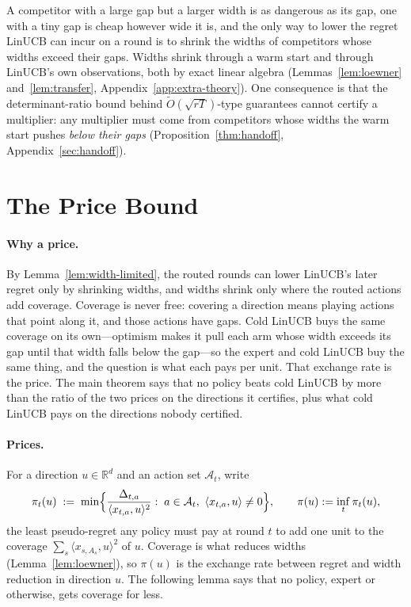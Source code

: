\documentclass{article}
\theoremstyle{definition}
\theoremstyle{remark}
\newcommand{\R}{\mathbb{R}}
\theoremstyle{remark}
\begin{document}
A competitor with a large gap but a larger width is as dangerous as its gap,
one with a tiny gap is cheap however wide it is, and the only way to lower the
regret LinUCB can incur on a round is to shrink the widths of competitors
whose widths exceed their gaps. Widths shrink through a warm start and through
LinUCB's own observations, both by exact linear algebra
(Lemmas~\ref{lem:loewner} and~\ref{lem:transfer},
Appendix~\ref{app:extra-theory}). One consequence is that the
determinant-ratio bound behind $\widetilde O(\sqrt{rT})$-type guarantees
cannot certify a multiplier: any multiplier must come from competitors whose
widths the warm start pushes \emph{below their gaps}
(Proposition~\ref{thm:handoff}, Appendix~\ref{sec:handoff}).

\section{The Price Bound}
\label{sec:price}

\paragraph{Why a price.}
By Lemma~\ref{lem:width-limited}, the routed rounds can lower LinUCB's later
regret only by shrinking widths, and widths shrink only where the routed
actions add coverage. Coverage is never free: covering a direction means
playing actions that point along it, and those actions have gaps. Cold
LinUCB buys the same coverage on its own---optimism makes it pull each arm
whose width exceeds its gap until that width falls below the gap---so the
expert and cold LinUCB buy the same thing, and the question is what each pays
per unit. That exchange rate is the price. The main theorem says that no
policy beats cold LinUCB by more than the ratio of the two prices on the
directions it certifies, plus what cold LinUCB pays on the directions nobody
certified.

\paragraph{Prices.}
For a direction $u\in\R^d$ and an
action set $\mathcal A_t$, write
\begin{equation}
\label{eq:price}
\pi_t(u)\;:=\;\min\Bigl\{\frac{\Delta_{t,a}}{\langle x_{t,a},u\rangle^2}:\;a\in\mathcal A_t,\ \langle x_{t,a},u\rangle\neq0\Bigr\},
\qquad \pi(u):=\inf_t\pi_t(u),
\end{equation}
the least pseudo-regret any policy must pay at round $t$ to add one unit to
the coverage $\sum_s\langle x_{s,A_s},u\rangle^2$ of $u$. Coverage is what
reduces widths (Lemma~\ref{lem:loewner}), so $\pi(u)$ is the exchange rate
between regret and width reduction in direction $u$. The following lemma
says that no policy, expert or otherwise, gets coverage for less.
\end{document}
